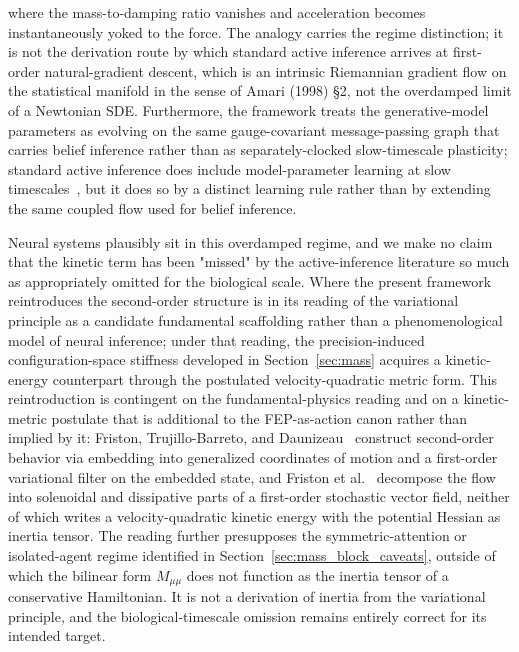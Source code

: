 \documentclass[11pt]{article}
\begin{document}
where the mass-to-damping ratio vanishes and acceleration becomes instantaneously yoked to the force. The analogy carries the regime distinction; it is not the derivation route by which standard active inference arrives at first-order natural-gradient descent, which is an intrinsic Riemannian gradient flow on the statistical manifold in the sense of Amari (1998) \S2, not the overdamped limit of a Newtonian SDE. Furthermore, the framework treats the generative-model parameters as evolving on the same gauge-covariant message-passing graph that carries belief inference rather than as separately-clocked slow-timescale plasticity; standard active inference does include model-parameter learning at slow timescales~\cite{Friston2010, Friston2017, Parr2022}, but it does so by a distinct learning rule rather than by extending the same coupled flow used for belief inference.

Neural systems plausibly sit in this overdamped regime, and we make no claim that the kinetic term has been "missed" by the active-inference literature so much as appropriately omitted for the biological scale. Where the present framework reintroduces the second-order structure is in its reading of the variational principle as a candidate fundamental scaffolding rather than a phenomenological model of neural inference; under that reading, the precision-induced configuration-space stiffness developed in Section~\ref{sec:mass} acquires a kinetic-energy counterpart through the postulated velocity-quadratic metric form. This reintroduction is contingent on the fundamental-physics reading and on a kinetic-metric postulate that is additional to the FEP-as-action canon rather than implied by it: Friston, Trujillo-Barreto, and Daunizeau~\cite{Friston2008DEM} construct second-order behavior via embedding into generalized coordinates of motion and a first-order variational filter on the embedded state, and Friston et al.~\cite{Friston2023PhysReports} decompose the flow into solenoidal and dissipative parts of a first-order stochastic vector field, neither of which writes a velocity-quadratic kinetic energy with the potential Hessian as inertia tensor. The reading further presupposes the symmetric-attention or isolated-agent regime identified in Section~\ref{sec:mass_block_caveats}, outside of which the bilinear form $M_{\mu\mu}$ does not function as the inertia tensor of a conservative Hamiltonian. It is not a derivation of inertia from the variational principle, and the biological-timescale omission remains entirely correct for its intended target.
\end{document}
